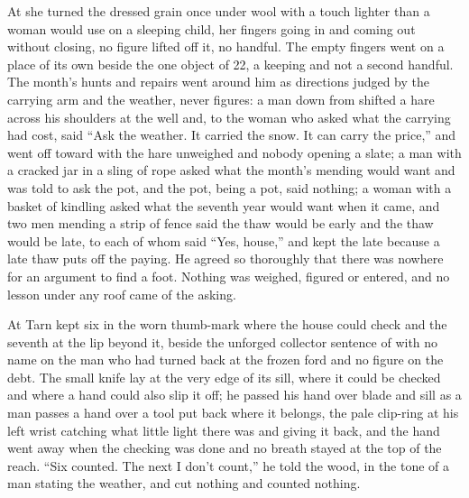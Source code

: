 At  she turned the dressed grain once under wool with a touch lighter than a woman would use on a sleeping child, her fingers going in and coming out without closing, no figure lifted off it, no handful. The empty fingers went on a place of its own beside the one object of  22, a keeping and not a second handful. The month's hunts and repairs went around him as directions judged by the carrying arm and the weather, never figures: a man down from  shifted a hare across his shoulders at the well and, to the woman who asked what the carrying had cost, said “Ask the weather. It carried the snow. It can carry the price,” and went off toward  with the hare unweighed and nobody opening a slate; a man with a cracked jar in a sling of rope asked what the month's mending would want and was told to ask the pot, and the pot, being a pot, said nothing; a woman with a basket of kindling asked what the seventh year would want when it came, and two men mending a strip of fence said the thaw would be early and the thaw would be late, to each of whom  said “Yes, house,” and kept the late because a late thaw puts off the paying. He agreed so thoroughly that there was nowhere for an argument to find a foot. Nothing was weighed, figured or entered, and no lesson under any roof came of the asking.

\scenebreak

At  Tarn kept six in the worn thumb-mark where the house could check and the seventh at the lip beyond it, beside the unforged collector sentence of  with no name on the man who had turned back at the frozen ford and no figure on the debt. The small knife lay at the very edge of its sill, where it could be checked and where a hand could also slip it off; he passed his hand over blade and sill as a man passes a hand over a tool put back where it belongs, the pale clip-ring at his left wrist catching what little light there was and giving it back, and the hand went away when the checking was done and no breath stayed at the top of the reach. “Six counted. The next I don't count,” he told the wood, in the tone of a man stating the weather, and cut nothing and counted nothing.

